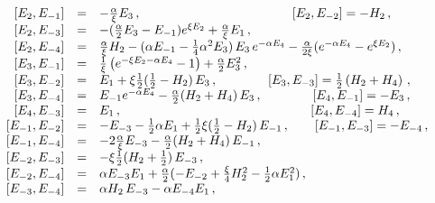 \begin{equation}
\begin{array}{rrl}
\cr [ E_2 , E_{-1} ]& =& - \frac{\alpha}{\xi} E_3 \, ,
\qquad \qquad \qquad\qquad\qquad \qquad
 [ E_2 , E_{-2} ] = - H_2 \, ,
\cr
 [ E_2 , E_{-3} ]& =& - ( \frac{\alpha}{2}E_3 - E_{-1})e^{\xi E_2}
+\frac{\alpha}{\xi} E_1 \, ,
\cr [ E_2 , E_{-4} ]& =&  \frac{\alpha}{\xi} H_2
    -  ( \alpha E_{-1} - \frac{1}{4} \alpha^2 E_3)\, E_3 \,
    e^{- \alpha E_4} - \frac{\alpha}{2 \xi} (e^{-\alpha E_4}
    - e^{\xi E_2}) \, ,
\cr [ E_3 , E_{-1} ]& =& \frac{1}{\xi}
    \left( e^{-\xi E_2 - \alpha E_4}-1 \right)
    + \frac{\alpha}{2} E^2_3  \, ,
\cr [ E_3 , E_{-2} ]& =& E_1
    +\xi \frac{1}{2}(\frac{1}{2}-H_2 )\, E_3 \, ,
\qquad\qquad
[ E_3 , E_{-3} ] =  \frac{1}{2} \left( H_2 + H_4 \right)\, ,
\cr [ E_3 , E_{-4} ]& =& E_{-1}e^{-\alpha E_4} -\frac{\alpha}{2}
    (H_2 + H_4)\, E_3 \, ,
\qquad\qquad [ E_4 , E_{-1} ] =  - E_3 \, ,
\cr [ E_4 , E_{-3} ]& =& E_1 \, ,
\qquad\quad\qquad\qquad \qquad\qquad\qquad \qquad [ E_4 , E_{-4} ] = H_4 \, ,
\cr [ E_{-1} ,E_{-2} ]& =& - E_{-3} - \frac{1}{2} \alpha E_1 +
    \frac{1}{2} \xi (\frac{1}{2} - H_2 )\, E_{-1} \, ,
\qquad
 [ E_{-1} , E_{-3} ] =  - E_{-4} \, ,
\cr [ E_{-1} , E_{-4} ]& =& -2\frac{\alpha}{\xi} E_{-3}
    - \frac{\alpha}{2}(H_2 + H_4)\, E_{-1} \, ,
\cr
 [ E_{-2} , E_{-3} ] &=& - \xi \frac{1}{2}(H_2 + \frac{1}{2})\, E_{-3} \, ,
\cr [ E_{-2} , E_{-4} ]& =&  \alpha E_{-3} E_1 + \frac{\alpha}{2}
    (-E_{-2} + \frac{\xi}{4}H^2_2 -\frac{1}{2}\alpha E^2_1) \, ,
\cr [ E_{-3} , E_{-4} ]& =&  \alpha H_2 \, E_{-3} - \alpha E_{-4} E_1 \, ,
\end{array}
\end{equation}

